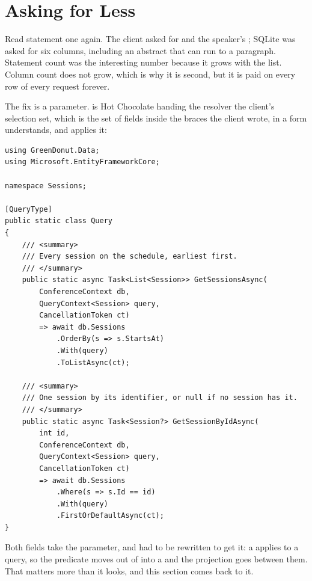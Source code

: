 \section{Asking for Less}
\label{sec:ch03-asking-for-less}

%
Read statement one again. The client asked for  and the speaker's
; SQLite was asked for six columns, including an abstract that can
run to a paragraph. Statement count was the interesting number because it grows
with the list. Column count does not grow, which is why it is second, but it is
paid on every row of every request forever.

%
%
The fix is a parameter.  is Hot Chocolate handing
the resolver the client's selection set, which is the set of fields inside the
braces the client wrote, in a form  understands, and
 applies it:

\begin{verbatim}
using GreenDonut.Data;
using Microsoft.EntityFrameworkCore;

namespace Sessions;

[QueryType]
public static class Query
{
    /// <summary>
    /// Every session on the schedule, earliest first.
    /// </summary>
    public static async Task<List<Session>> GetSessionsAsync(
        ConferenceContext db,
        QueryContext<Session> query,
        CancellationToken ct)
        => await db.Sessions
            .OrderBy(s => s.StartsAt)
            .With(query)
            .ToListAsync(ct);

    /// <summary>
    /// One session by its identifier, or null if no session has it.
    /// </summary>
    public static async Task<Session?> GetSessionByIdAsync(
        int id,
        ConferenceContext db,
        QueryContext<Session> query,
        CancellationToken ct)
        => await db.Sessions
            .Where(s => s.Id == id)
            .With(query)
            .FirstOrDefaultAsync(ct);
}
\end{verbatim}

Both fields take the parameter, and  had to be
rewritten to get it: a  applies to a query, so the
predicate moves out of  into a  and the
projection goes between them. That matters more than it looks, and
this section comes back to it.

